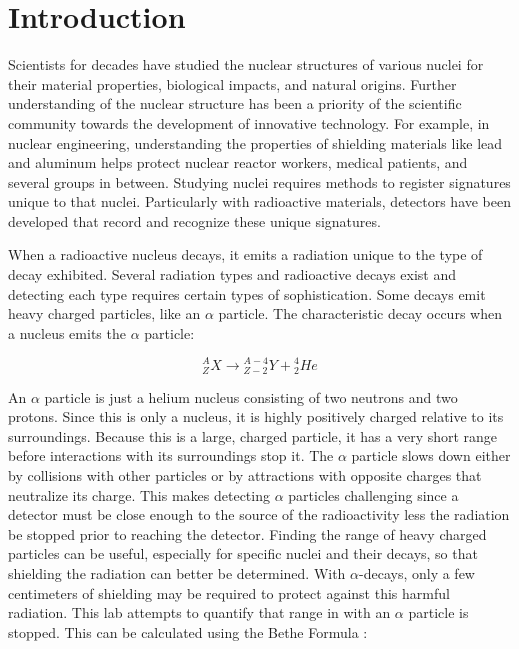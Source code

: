 \section{Introduction}

Scientists for decades have studied the nuclear structures of various nuclei for their material properties, biological impacts, and natural origins. Further understanding of the nuclear structure has been a priority of the scientific community towards the development of innovative technology. For example, in nuclear engineering, understanding the properties of shielding materials like lead and aluminum helps protect nuclear reactor workers, medical patients, and several groups in between. Studying nuclei requires methods to register signatures unique to that nuclei. Particularly with radioactive materials, detectors have been developed that record and recognize these unique signatures.

When a radioactive nucleus decays, it emits a radiation unique to the type of decay exhibited. Several radiation types and radioactive decays exist and detecting each type requires certain types of sophistication. Some decays emit heavy charged particles, like an $\alpha$ particle. The characteristic decay occurs when a nucleus emits the $\alpha$ particle:

\begin{equation}
{}^{A}_{Z}X \rightarrow {}^{A-4}_{Z-2}Y + {}^{4}_{2}{He}
\end{equation}

An $\alpha$ particle is just a helium nucleus consisting of two neutrons and two protons. Since this is only a nucleus, it is highly positively charged relative to its surroundings. Because this is a large, charged particle, it has a very short range before interactions with its surroundings stop it. The $\alpha$ particle slows down either by collisions with other particles or by attractions with opposite charges that neutralize its charge. This makes detecting $\alpha$ particles challenging since a detector must be close enough to the source of the radioactivity less the radiation be stopped prior to reaching the detector. Finding the range of heavy charged particles can be useful, especially for specific nuclei and their decays, so that shielding the radiation can better be determined. With $\alpha$-decays, only a few centimeters of shielding may be required to protect against this harmful radiation. This lab attempts to quantify that range in with an $\alpha$ particle is stopped. This can be calculated using the Bethe Formula \cite{melissinos}:

